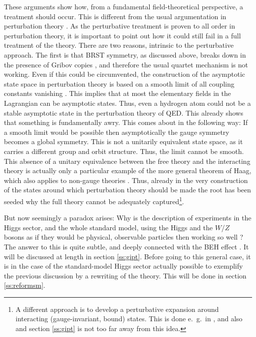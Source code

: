 \documentclass[final,12pt]{article}
\newcommand*{\1}{1\!\!\!\bot}
\begin{document}
These arguments show how, from a fundamental field-theoretical perspective, a treatment should occur. This is different from the usual argumentation in perturbation theory \cite{Bohm:2001yx}. As the perturbative treatment is proven to all order in perturbation theory, it is important to point out how it could still fail in a full treatment of the theory. There are two reasons, intrinsic to the perturbative approach. The first is that BRST symmetry, as discussed above, breaks down in the presence of Gribov copies \cite{Fujikawa:1982ss}, and therefore the usual quartet mechanism is not working. Even if this could be circumvented, the construction of the asymptotic state space in perturbation theory is based on a smooth limit of all coupling constants vanishing \cite{Bohm:2001yx}. This implies that at most the elementary fields in the Lagrangian can be asymptotic states. Thus, even a hydrogen atom could not be a stable asymptotic state in the perturbation theory of QED. This already shows that something is fundamentally awry. This comes about in the following way: If a smooth limit would be possible then asymptotically the gauge symmetry becomes a global symmetry. This is not a unitarily equivalent state space, as it carries a different group and orbit structure. Thus, the limit cannot be smooth. This absence of a unitary equivalence between the free theory and the interacting theory is actually only a particular example of the more general theorem of Haag, which also applies to non-gauge theories \cite{Haag:1992hx}. Thus, already in the very construction of the states around which perturbation theory should be made the root has been seeded why the full theory cannot be adequately captured\footnote{A different approach is to develop a perturbative expansion around interacting (gauge-invariant, bound) states. This is done e.\ g.\ in \cite{Hoyer:2014gna,Hoyer:2016orc,Attard:2017sdn}, and also \cite{Frohlich:1980gj,Frohlich:1981yi,Philipsen:1996af,Maas:2012tj} and section \ref{ss:gipt} is not too far away from this idea.}.

But now seemingly a paradox arises: Why is the description of experiments in the Higgs sector, and the whole standard model, using the Higgs and the $W$/$Z$ bosons as if they would be physical, observable particles then working so well \cite{Bohm:2001yx,pdg,Djouadi:2005gi,Dawson:2018dcd}? The answer to this is quite subtle, and deeply connected with the BEH effect \cite{Frohlich:1980gj,Frohlich:1981yi}. It will be discussed at length in section \ref{ss:gipt}. Before going to this general case, it is in the case of the standard-model Higgs sector actually possible to exemplify the previous discussion by a rewriting of the theory. This will be done in section \ref{ss:reformsm}.
\end{document}
